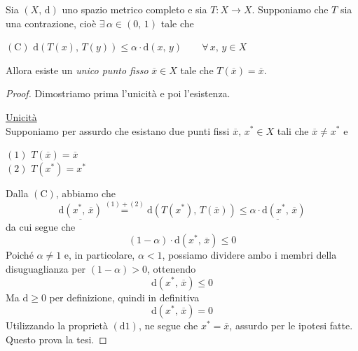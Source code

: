 \begin{thm}
Sia $(X,\,\mathrm{d})$ uno spazio metrico completo e sia $T : X \longrightarrow X$. Supponiamo che $T$ sia una contrazione, cioè $\exists \, \alpha \in (0,\,1)$ tale che
\begin{center}
$\mathrm{(C)}$
\hfill
$\displaystyle
\mathrm{d}\left( T(x),\,T(y) \right) \leq \alpha \cdot \mathrm{d}(x,\,y) \qquad \forall \, x,\,y \in X
$
\hfill \null \\
\end{center}
Allora esiste un \emph{unico punto fisso} $\overline{x} \in X$ tale che $T(\overline{x}) = \overline{x}$.
\end{thm}
\begin{proof}
Dimostriamo prima l'unicità e poi l'esistenza.

\noindent\underline{Unicità}\\
Supponiamo per assurdo che esistano due punti fissi $\overline{x},\,x^* \in X$ tali che $\overline{x} \neq x^*$ e
\begin{center}
$\mathrm{(1)}$
\hfill
$\displaystyle
T(\overline{x}) = \overline{x}
$
\hfill \null \\
\vskip 10pt
$\mathrm{(2)}$
\hfill
$\displaystyle
T(x^*) = x^*
$
\hfill \null \\
\end{center}
Dalla $\mathrm{(C)}$, abbiamo che
$$
\underline{\mathrm{d}(x^*,\,\overline{x})} \overset{\mathrm{(1)}+\mathrm{(2)}}{=}
\mathrm{d}\left( T(x^*),\,T(\overline{x}) \right) \leq
\underline{\alpha \cdot \mathrm{d}(x^*,\,\overline{x})}
$$
da cui segue che
$$
(1-\alpha) \cdot \mathrm{d}(x^*,\,\overline{x}) \leq 0
$$
Poiché $\alpha \neq 1$ e, in particolare, $\alpha < 1$, possiamo dividere ambo i membri della disuguaglianza per $(1-\alpha) > 0$, ottenendo
$$
\mathrm{d}(x^*,\,\overline{x}) \leq 0
$$
Ma $\mathrm{d} \geq 0$ per definizione, quindi in definitiva
$$
\mathrm{d}(x^*,\,\overline{x}) = 0
$$
Utilizzando la proprietà $\mathrm{(d1)}$, ne segue che $x^* = \overline{x}$, assurdo per le ipotesi fatte. Questo prova la tesi.


\end{proof}
